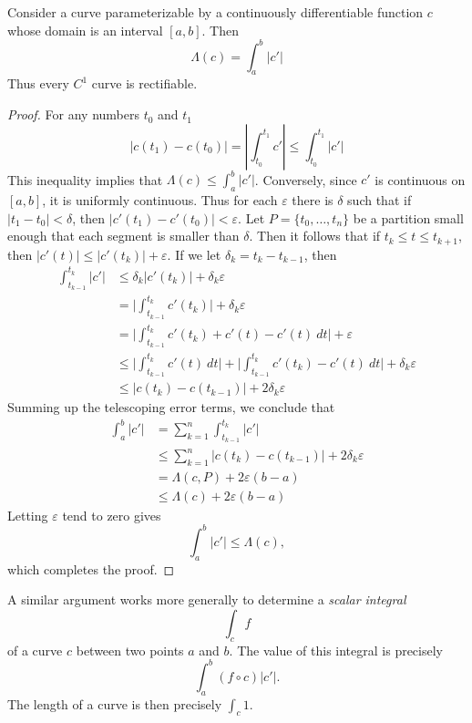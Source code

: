 \begin{theorem}
    Consider a curve parameterizable by a continuously differentiable function $c$ whose domain is an interval $[a,b]$. Then
    \[ \Lambda(c) = \int_a^b |c'| \]
    Thus every $C^1$ curve is rectifiable.
\end{theorem}
\begin{proof}
  For any numbers $t_0$ and $t_1$
    \[ |c(t_1) - c(t_0)| = \left| \int_{t_0}^{t_1} c' \right| \leq \int_{t_0}^{t_1} |c'| \]
    This inequality implies that $\Lambda(c) \leq \int_a^b |c'|$. Conversely, since $c'$ is continuous on $[a,b]$, it is uniformly continuous. Thus for each $\varepsilon$ there is $\delta$ such that if $| t_1 - t_0 | < \delta$, then $|c'(t_1) - c'(t_0)| < \varepsilon$. Let $P = \{ t_0, \dots, t_n \}$ be a partition small enough that each segment is smaller than $\delta$. Then it follows that if $t_k \leq t \leq t_{k+1}$, then $|c'(t)| \leq |c'(t_k)| + \varepsilon$. If we let $\delta_k = t_k - t_{k-1}$, then
    \begin{align*}
    \int_{t_{k-1}}^{t_k} |c'| &\leq \delta_k |c'(t_k)| + \delta_k \varepsilon\\
    &= \bigg| \int_{t_{k-1}}^{t_k} c'(t_k) \bigg| + \delta_k \varepsilon\\
    &= \bigg| \int_{t_{k-1}}^{t_k} c'(t_k) + c'(t) - c'(t)\ dt \bigg| + \varepsilon\\
    &\leq \bigg| \int_{t_{k-1}}^{t_k} c'(t)\ dt \bigg| + \bigg| \int_{t_{k-1}}^{t_k} c'(t_k) - c'(t)\ dt \bigg| + \delta_k \varepsilon\\
    &\leq | c(t_k) - c(t_{k-1}) | + 2 \delta_k \varepsilon
    \end{align*}
    Summing up the telescoping error terms, we conclude that
    \begin{align*}
      \int_a^b |c'| &= \sum_{k = 1}^n \int_{t_{k-1}}^{t_k} |c'|\\
      &\leq \sum_{k = 1}^n |c(t_k) - c(t_{k-1})| + 2 \delta_k \varepsilon\\
      &= \Lambda(c,P) + 2\varepsilon (b - a)\\
      &\leq \Lambda(c) + 2 \varepsilon (b - a)
    \end{align*}
    Letting $\varepsilon$ tend to zero gives
    \[ \int_a^b |c'| \leq \Lambda(c), \]
    which completes the proof.
\end{proof}

A similar argument works more generally to determine a \emph{scalar integral}
%
\[ \int_c f \]
%
of a curve $c$ between two points $a$ and $b$. The value of this integral is precisely
%
\[ \int_a^b (f \circ c) |c'|. \]
%
The length of a curve is then precisely $\int_c 1$.

